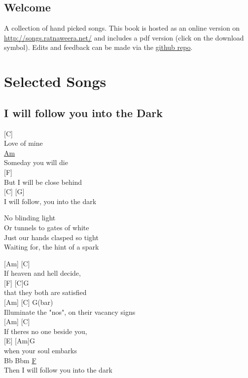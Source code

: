 \documentclass[
  letterpaper,
]{scrbook}
\renewcommand*\contentsname{Table of contents}
\newcommand\contentsname{Table of contents}
\begin{document}
\renewcommand*\contentsname{Table of contents}
{
\setcounter{tocdepth}{2}
\tableofcontents
}
\mainmatter
{}

\hypertarget{title}{%
\chapter*{Welcome}\label{title}}


A collection of hand picked songs. This book is hosted as an online
version on \url{http://songs.ratnaweera.net/} and includes a pdf version
(click on the download symbol). Edits and feedback can be made via the
\href{https://github.com/ratnanil/songs}{github repo}.

\part{Selected Songs}

\hypertarget{i-will-follow-you-into-the-dark}{%
\chapter{I will follow you into the
Dark}\label{i-will-follow-you-into-the-dark}}

{[}C{]}\\
Love of mine\\
\href{D\%20root\%20note}{Am}\\
Someday you will die\\
{[}F{]}\\
But I will be close behind\\
{[}C{]} {[}G{]}\\
I will follow, you into the dark

No blinding light\\
Or tunnels to gates of white\\
Just our hands clasped so tight\\
Waiting for, the hint of a spark

{[}Am{]} {[}C{]}\\
If heaven and hell decide,\\
{[}F{]} {[}C{]}G\\
that they both are satisfied\\
{[}Am{]} {[}C{]} G(bar)\\
Illuminate the "no\textquotesingle s", on their vacancy signs\\
{[}Am{]} {[}C{]}\\
If there\textquotesingle s no one beside you,\\
{[}E{]} {[}Am{]}G\\
when your soul embarks\\
Bb Bbm \href{C\%20root\%20note}{F}\\
Then I will follow you into the dark
\end{document}
